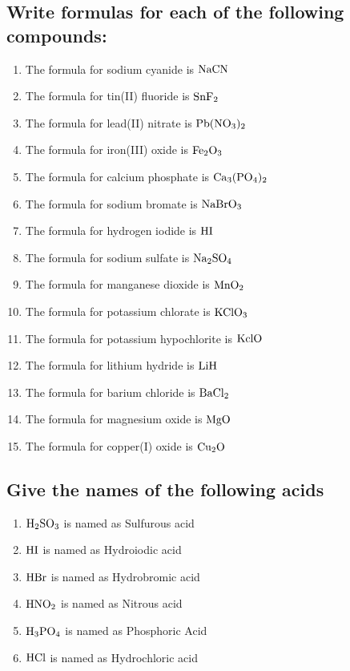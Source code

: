\documentclass[11pt]{article}
\begin{document}
\subsection{Write formulas for each of the following compounds:}
\label{sec:org57e30f2}
\begin{enumerate}
\item The formula for sodium cyanide is \(\ce{NaCN}\)
\item The formula for tin(II) fluoride is \(\ce{SnF2}\)
\item The formula for lead(II) nitrate is \(\ce{Pb(NO3)2}\)
\item The formula for iron(III) oxide is \(\ce{Fe2O3}\)
\item The formula for calcium phosphate is \(\ce{Ca3(PO4)2}\)
\item The formula for sodium bromate is \(\ce{NaBrO3}\)
\item The formula for hydrogen iodide is \(\ce{HI}\)
\item The formula for sodium sulfate is \(\ce{Na2SO4}\)
\item The formula for manganese dioxide is \(\ce{MnO2}\)
\item The formula for potassium chlorate is \(\ce{KClO3}\)
\item The formula for potassium hypochlorite is \(\ce{KclO}\)
\item The formula for lithium hydride is \(\ce{LiH}\)
\item The formula for barium chloride is \(\ce{BaCl2}\)
\item The formula for magnesium oxide is \(\ce{MgO}\)
\item The formula for copper(I) oxide is \(\ce{Cu2O}\)
\end{enumerate}

\subsection{Give the names of the following acids}
\label{sec:org7b7788d}
\begin{enumerate}
\item \(\ce{H2SO3}\) is named as Sulfurous acid
\item \(\ce{HI}\) is named as Hydroiodic acid
\item \(\ce{HBr}\) is named as Hydrobromic acid
\item \(\ce{HNO2}\) is named as Nitrous acid
\item \(\ce{H3PO4}\) is named as Phosphoric Acid
\item \(\ce{HCl}\) is named as Hydrochloric acid
\end{enumerate}
\end{document}
